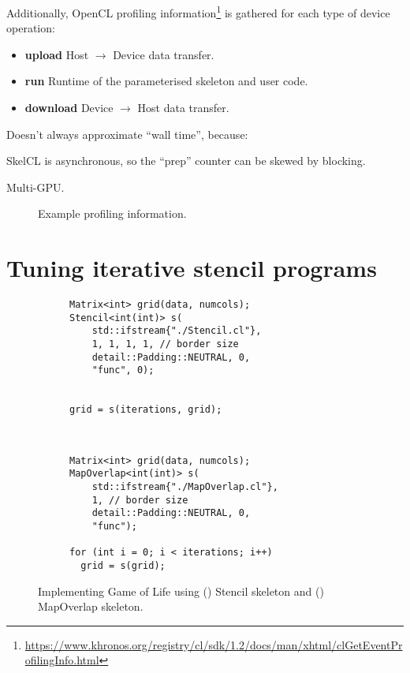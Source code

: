 \noindent
Additionally, OpenCL profiling
information\footnote{\url{https://www.khronos.org/registry/cl/sdk/1.2/docs/man/xhtml/clGetEventProfilingInfo.html}}
is gathered for each type of device operation:

\begin{itemize}
\item \textbf{upload} Host $\rightarrow$ Device data transfer.
\item \textbf{run} Runtime of the parameterised skeleton and user
  code.
\item \textbf{download} Device $\rightarrow$ Host data transfer.
\end{itemize}

Doesn't always approximate ``wall time'', because:

SkelCL is asynchronous, so the ``prep'' counter can be skewed by
blocking.

Multi-GPU.


\begin{figure}
\centering

\caption{%
Example profiling information.%
}
\label{fig:events}
\end{figure}

\section{Tuning iterative stencil programs}

\begin{figure}
\begin{subfigure}[t]{0.45\textwidth}
\centering
\lstset{language=C++}
\begin{lstlisting}
Matrix<int> grid(data, numcols);
Stencil<int(int)> s(
    std::ifstream{"./Stencil.cl"},
    1, 1, 1, 1, // border size
    detail::Padding::NEUTRAL, 0,
    "func", 0);


grid = s(iterations, grid);
\end{lstlisting}
\caption{}
\label{lst:gol-stencil}
\end{subfigure}
~\hspace{1.5em}
\begin{subfigure}[t]{0.45\textwidth}
\centering
\lstset{language=C++}
\begin{lstlisting}
Matrix<int> grid(data, numcols);
MapOverlap<int(int)> s(
    std::ifstream{"./MapOverlap.cl"},
    1, // border size
    detail::Padding::NEUTRAL, 0,
    "func");

for (int i = 0; i < iterations; i++)
  grid = s(grid);
\end{lstlisting}
\caption{}
\label{lst:gol-mo}
\end{subfigure}
\caption{%
  Implementing Game of Life using () Stencil
  skeleton and () MapOverlap skeleton.%
}
\end{figure}



